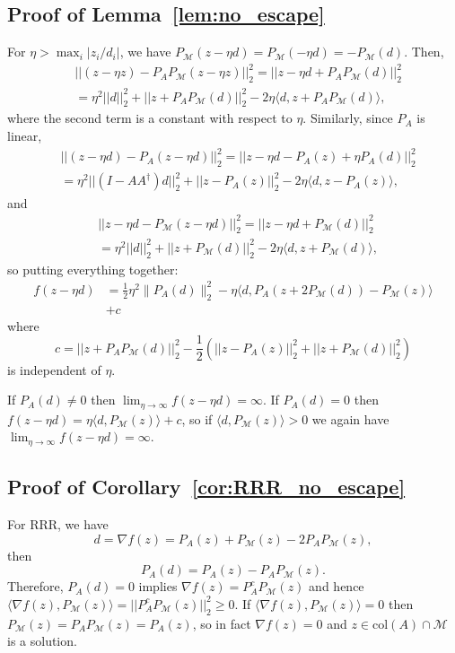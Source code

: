 \documentclass[journal]{IEEEtran}
\theoremstyle{definition}
\theoremstyle{remark}
\theoremstyle{definition}
\theoremstyle{problem}
\theoremstyle{definition}
\newcommand{\col}{\text{col}}
\newcommand{\MM}{\mathcal{M}}
\begin{document}
\subsection{Proof of Lemma~\ref{lem:no_escape}}\label{sec:pf_no_escape}

For $\eta>\max_i|z_i/d_i|$, we have $P_{\MM}(z-\eta d) = P_{\MM}(-\eta d) = -P_{\MM}(d)$. Then,
\[\begin{aligned} &||(z-\eta z) - P_AP_{\MM}(z-\eta z)||_2^2 = ||z-\eta d + P_AP_{\MM}(d)||_2^2\\
&= \eta^2||d||_2^2 + ||z + P_AP_{\MM}(d)||_2^2 - 2\eta\langle d, z + P_AP_{\MM}(d)\rangle,\end{aligned}\]
where the second term is a constant with respect to $\eta$. Similarly, since $P_A$ is linear,
\[\begin{aligned} &||(z-\eta d) - P_A(z-\eta d)||_2^2 = ||z-\eta d - P_A(z) + \eta P_A(d)||_2^2\\
&= \eta^2||(I-AA^{\dagger})d||_2^2 + ||z-P_A(z)||_2^2 - 2\eta \langle d, z-P_A(z)\rangle,\end{aligned}\]
and
\[\begin{aligned} &||z-\eta d - P_{\MM}(z-\eta d)||_2^2 = ||z-\eta d + P_{\MM}(d)||_2^2\\
&= \eta^2||d||_2^2 + ||z+P_{\MM}(d)||_2^2 - 2\eta\langle d, z+P_{\MM}(d)\rangle,\end{aligned}\]
so putting everything together:
\[\begin{aligned}
f(z-\eta d) &= \frac{1}{2}\eta^2 \|P_A(d)\|_2^2 - \eta\langle d, P_A(z + 2P_{\MM}(d)) - P_{\MM}(z)\rangle \\&+ c
\end{aligned}\]
where $$c = ||z + P_AP_{\MM}(d)||_2^2 - \frac{1}{2}\left(||z-P_A(z)||_2^2 + ||z+P_{\MM}(d)||_2^2\right)$$ is independent of $\eta$.

If $P_A(d)\neq 0$ then $\lim_{\eta\to\infty}f(z-\eta d)=\infty$. If $P_A(d) = 0$ then $f(z-\eta d) = \eta\langle d, P_{\MM}(z)\rangle + c$, so if $\langle d,P_{\MM}(z)\rangle > 0$ we again have $\lim_{\eta\to\infty}f(z-\eta d)=\infty$.

\subsection{Proof of Corollary~\ref{cor:RRR_no_escape}}\label{sec:pf_RRR_no_escape}

For RRR, we have $$d=\nabla f(z) = P_A(z) + P_{\MM}(z) - 2P_AP_{\MM}(z),$$ then $$P_A(d) = P_A(z) - P_AP_{\MM}(z).$$ Therefore, $P_A(d) = 0$ implies $\nabla f(z) = P_A^cP_{\MM}(z)$ and hence $\langle \nabla f(z), P_{\MM}(z)\rangle = ||P_A^cP_{\MM}(z)||_2^2 \geq 0$. If $\langle \nabla f(z), P_{\MM}(z)\rangle = 0$ then $P_{\MM}(z) = P_AP_{\MM}(z) = P_A(z)$, so in fact $\nabla f(z) = 0$ and $z\in\col(A)\cap\MM$ is a solution.
\end{document}
